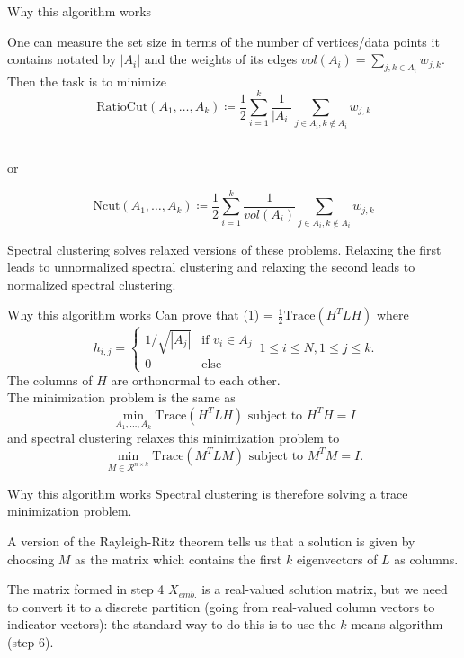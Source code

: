 \documentclass{beamer}
\begin{document}
\begin{frame}{Why this algorithm works}
    \begin{outline}
    \1 One can measure the set size in terms of the number of vertices/data points it contains notated by $|A_i|$ and the weights of its edges $vol(A_i) = \sum_{j, k \in A_i} w_{j, k}$. 
    \1 Then the task is to minimize \vspace{0.1 cm}
    \begin{equation}
    \textrm{RatioCut}(A_1, \dots, A_k) \coloneqq \frac{1}{2}\sum_{i=1}^k \frac{1}{|A_i|}  \sum_{j \in A_i, k \not \in A_i} w_{j, k}
    \end{equation}\\ %
    \begin{centering}
        or
    \end{centering}
    $$
     \textrm{Ncut}(A_1, \dots, A_k) \coloneqq \frac{1}{2}\sum_{i=1}^k \frac{1}{vol(A_i)}  \sum_{j \in A_i, k \not \in A_i} w_{j, k}
    $$
    \end{outline}
    Spectral clustering solves relaxed versions of these problems. Relaxing the first leads to unnormalized spectral clustering and relaxing the second leads to normalized spectral clustering.
\end{frame}


\begin{frame}{Why this algorithm works}
    Can prove that (1) = $\frac{1}{2}\textrm{Trace}(H^TLH)$ where
    $$
    h_{i,j} = \begin{cases}
        1/\sqrt{|A_j|} &\textrm{if } v_i \in A_j \\
        0 &\textrm{else }
    \end{cases} \, 1 \leq i \leq N, 1 \leq j \leq k.
    $$ The columns of $H$ are orthonormal to each other. \\
    The minimization problem is the same as 
    $$
    \min_{A_1, \dots, A_k} \textrm{Trace}(H^TLH) \textrm{ subject to } H^TH = I
    $$
    and spectral clustering relaxes this minimization problem to 
     $$
    \min_{M \in \mathcal{R}^{n \times k}} \textrm{Trace}(M^TLM) \textrm{ subject to } M^TM = I.
    $$
\end{frame}

\begin{frame}{Why this algorithm works}
    Spectral clustering is therefore solving a trace minimization problem. \\ \vspace{0.25cm}

    A version of the Rayleigh-Ritz theorem tells us that a solution is given by choosing $M$ as the matrix which contains the first $k$ eigenvectors of $L$ as columns. \\\vspace{0.25cm}

    The matrix formed in step 4 $X_{emb.}$ is a real-valued solution matrix, but we need to convert it to a discrete partition (going from real-valued column vectors to indicator vectors): the standard way to do this is to use the $k$-means algorithm (step 6).
\end{frame}
\end{document}
